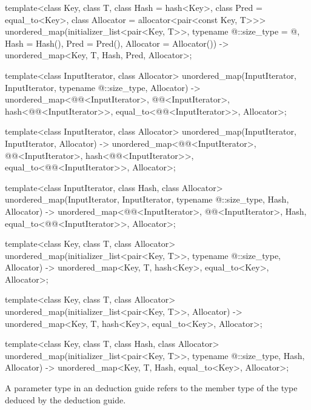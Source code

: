 \begin{codeblock}
{  template<class Key, class T, class Hash = hash<Key>,
           class Pred = equal_to<Key>, class Allocator = allocator<pair<const Key, T>>>
    unordered_map(initializer_list<pair<Key, T>>,
                  typename @\seebelow@::size_type = @\seebelow@, Hash = Hash(),
                  Pred = Pred(), Allocator = Allocator())
      -> unordered_map<Key, T, Hash, Pred, Allocator>;

  template<class InputIterator, class Allocator>
    unordered_map(InputIterator, InputIterator, typename @\seebelow@::size_type, Allocator)
      -> unordered_map<@@<InputIterator>, @@<InputIterator>,
                       hash<@@<InputIterator>>,
                       equal_to<@@<InputIterator>>, Allocator>;

  template<class InputIterator, class Allocator>
    unordered_map(InputIterator, InputIterator, Allocator)
      -> unordered_map<@@<InputIterator>, @@<InputIterator>,
                       hash<@@<InputIterator>>,
                       equal_to<@@<InputIterator>>, Allocator>;

  template<class InputIterator, class Hash, class Allocator>
    unordered_map(InputIterator, InputIterator, typename @\seebelow@::size_type, Hash, Allocator)
      -> unordered_map<@@<InputIterator>, @@<InputIterator>, Hash,
                       equal_to<@@<InputIterator>>, Allocator>;

  template<class Key, class T, class Allocator>
    unordered_map(initializer_list<pair<Key, T>>, typename @\seebelow@::size_type,
                  Allocator)
      -> unordered_map<Key, T, hash<Key>, equal_to<Key>, Allocator>;

  template<class Key, class T, class Allocator>
    unordered_map(initializer_list<pair<Key, T>>, Allocator)
      -> unordered_map<Key, T, hash<Key>, equal_to<Key>, Allocator>;

  template<class Key, class T, class Hash, class Allocator>
    unordered_map(initializer_list<pair<Key, T>>, typename @\seebelow@::size_type, Hash,
                  Allocator)
      -> unordered_map<Key, T, Hash, equal_to<Key>, Allocator>;
}
\end{codeblock}

\pnum
A  parameter type in an  deduction guide
refers to the  member type of the type deduced by the deduction guide.

